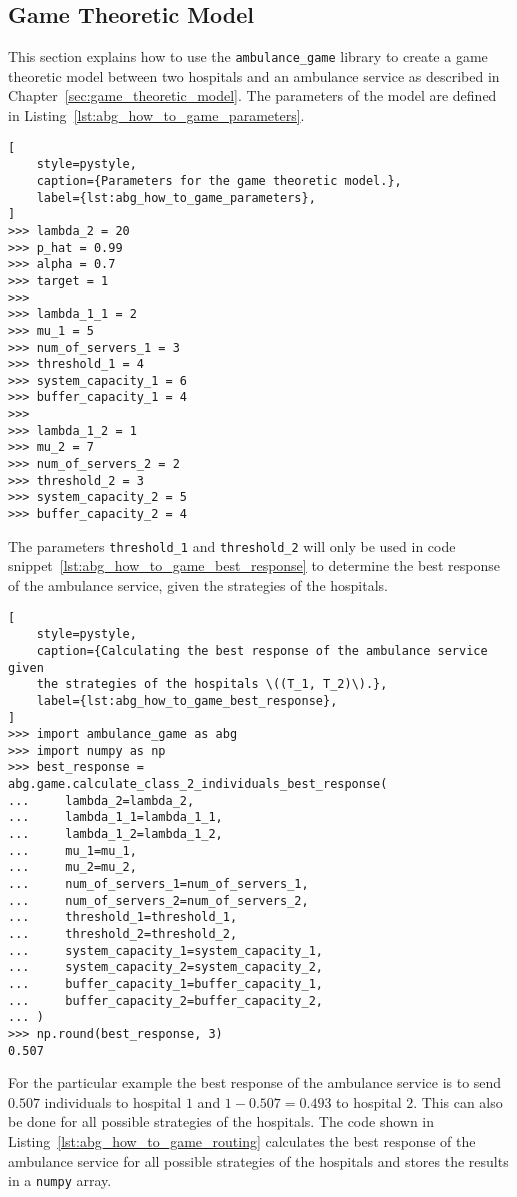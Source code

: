\subsection{Game Theoretic Model}

This section explains how to use the \texttt{ambulance\_game} library to create
a game theoretic model between two hospitals and an ambulance service as
described in Chapter~\ref{sec:game_theoretic_model}.
The parameters of the model are defined in
Listing~\ref{lst:abg_how_to_game_parameters}.

\begin{lstlisting}[
    style=pystyle,
    caption={Parameters for the game theoretic model.},
    label={lst:abg_how_to_game_parameters},
]
>>> lambda_2 = 20
>>> p_hat = 0.99
>>> alpha = 0.7
>>> target = 1
>>> 
>>> lambda_1_1 = 2
>>> mu_1 = 5
>>> num_of_servers_1 = 3
>>> threshold_1 = 4
>>> system_capacity_1 = 6
>>> buffer_capacity_1 = 4
>>> 
>>> lambda_1_2 = 1
>>> mu_2 = 7
>>> num_of_servers_2 = 2
>>> threshold_2 = 3
>>> system_capacity_2 = 5
>>> buffer_capacity_2 = 4

\end{lstlisting}

The parameters \texttt{threshold\_1} and \texttt{threshold\_2} will only be
used in code snippet~\ref{lst:abg_how_to_game_best_response} to determine the
best response of the ambulance service, given the strategies of the hospitals.

\begin{lstlisting}[
    style=pystyle,
    caption={Calculating the best response of the ambulance service given
    the strategies of the hospitals \((T_1, T_2)\).},
    label={lst:abg_how_to_game_best_response},
]
>>> import ambulance_game as abg
>>> import numpy as np
>>> best_response = abg.game.calculate_class_2_individuals_best_response(
...     lambda_2=lambda_2,
...     lambda_1_1=lambda_1_1,
...     lambda_1_2=lambda_1_2,
...     mu_1=mu_1,
...     mu_2=mu_2,
...     num_of_servers_1=num_of_servers_1,
...     num_of_servers_2=num_of_servers_2,
...     threshold_1=threshold_1,
...     threshold_2=threshold_2,
...     system_capacity_1=system_capacity_1,
...     system_capacity_2=system_capacity_2,
...     buffer_capacity_1=buffer_capacity_1,
...     buffer_capacity_2=buffer_capacity_2,
... )
>>> np.round(best_response, 3)
0.507

\end{lstlisting}

For the particular example the best response of the ambulance service is
to send \(0.507\) individuals to hospital \(1\) and \(1 - 0.507 = 0.493\) to
hospital \(2\).
This can also be done for all possible strategies of the hospitals.
The code shown in Listing~\ref{lst:abg_how_to_game_routing} calculates the
best response of the ambulance service for all possible strategies of the
hospitals and stores the results in a \texttt{numpy} array.

